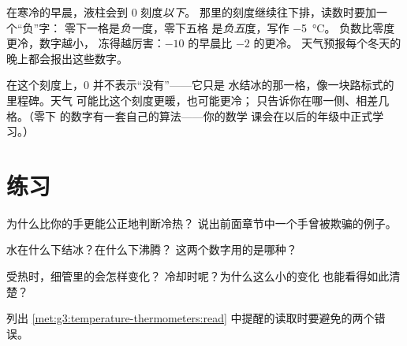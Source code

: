 \begin{example}[冬季的数字]\label{ex:g3:temperature-thermometers:belowzero}
在寒冷的早晨，液柱会到 $0$ 刻度\emph{以下}。
那里的刻度继续往下排，读数时要加一个“负”字：
零下一格是\emph{负一}度，零下五格
是\emph{负五}度，写作 \qty{-5}{\celsius}。
负数比零度更冷，数字越小，
冻得越厉害：$-10$ 的早晨比 $-2$ 的更冷。
天气预报每个冬天的晚上都会报出这些数字。
\end{example}

\begin{remark}[零不是“没有”]\label{rem:g3:temperature-thermometers:zero}
在这个刻度上，$0$ 并不表示“没有”——它只是
水结冰的那一格，像一块路标式的里程碑。天气
可能比这个刻度更暖，也可能更冷；
只告诉你在哪一侧、相差几格。（零下
的数字有一套自己的算法——你的数学
课会在以后的年级中正式学习。）
\end{remark}

\section{练习}

\begin{exercise}[$\star$]\label{exo:g3:temperature-thermometers:1}
为什么比你的手更能公正地判断冷热？
说出前面章节中一个手曾被欺骗的例子。
\end{exercise}

\begin{exercise}[$\star$]\label{exo:g3:temperature-thermometers:2}
水在什么下结冰？在什么下沸腾？
这两个数字用的是哪种？
\end{exercise}

\begin{exercise}[$\star$]\label{exo:g3:temperature-thermometers:3}
受热时，细管里的会怎样变化？
冷却时呢？为什么这么小的变化
也能看得如此清楚？
\end{exercise}

\begin{exercise}[$\star$]\label{exo:g3:temperature-thermometers:4}
列出 \cref{met:g3:temperature-thermometers:read}
中提醒的读取时要避免的两个错误。
\end{exercise}

